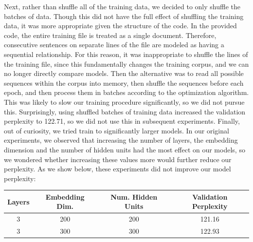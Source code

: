 \documentclass[a4paper]{article}
\begin{document}
Next, rather than shuffle all of the training data, we decided to only shuffle the batches of data. Though this did not have the full effect of shuffling the training data, it was more appropriate given the structure of the code. In the provided code, the entire training file is treated as a single document. Therefore, consecutive sentences on separate lines of the file are modeled as having a sequential relationship. For this reason, it was inappropriate to shuffle the lines of the training file, since this fundamentally changes the training corpus, and we can no longer directly compare models. Then the alternative was to read all possible sequences within the corpus into memory, then shuffle the sequences before each epoch, and then process them in batches according to the optimization algorithm. This was likely to slow our training procedure significantly, so we did not pursue this. Surprisingly, using shuffled batches of training data increased the validation perplexity to 122.71, so we did not use this in subsequent experiments.
\newline
\newline
Finally, out of curiosity, we tried train to significantly larger models. In our original experiments, we observed that increasing the number of layers, the embedding dimension and the number of hidden units had the most effect on our models, so we wondered whether increasing these values more would further reduce our perplexity. As we show below, these experiments did not improve our model perplexity:
\begin{center}
\begin{tabular}{|c | c | c | c |} 
\hline
Layers & Embedding Dim. & Num. Hidden Units & Validation Perplexity \\ \hline \hline
3 & 200 & 200 & 121.16 \\ \hline
3 & 300 & 300 & 122.93 \\ \hline
\end{tabular}
\end{center}
\end{document}
